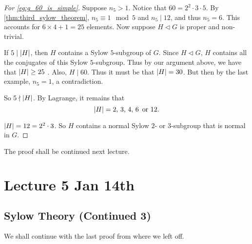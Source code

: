 \documentclass[notoc,notitlepage,nobib]{tufte-book}
\begin{document}
\begin{proof}[For \cref{eg:g_60_is_simple}]
  Suppose $n_5 > 1$. Notice that $60 = 2^2 \cdot 3 \cdot 5$. By \cref{thm:third_sylow_theorem},
  $n_5 \equiv 1 \mod 5$ and $n_5 \mid 12$, and thus $n_5 = 6$. This accounts for
  $6 \times 4 + 1 = 25$ elements. Now suppose $H \triangleleft G$ is proper and non-trivial.

  If $5 \mid \left| H \right|$, then $H$ contains a Sylow $5$-subgroup of $G$. Since
  $H \triangleleft G$, $H$ contains all the conjugates of this Sylow $5$-subgroup. Thus by
  our argument above, we have that $\left| H \right| \geq 25$ . Also, $H \mid 60$. Thus it must be that
  $\left| H \right| = 30$. But then by the last example, $n_5 = 1$, a contradiction.

  So $5 \nmid \left| H \right|$. By Lagrange, it remains that
  \begin{equation*}
    \left| H \right| = 2, \, 3, \, 4, \, 6\, \text{ or } 12.
  \end{equation*}

   $\left| H \right| = 12 = 2^2 \cdot 3$.
  So $H$ contains a normal Sylow $2$- or $3$-subgroup that is normal in $G$.
\end{proof}

The proof shall be continued next lecture.




\chapter{Lecture 5 Jan 14th}%
\label{chp:lecture_5_jan_14th}

\section{Sylow Theory (Continued 3)}%
\label{sec:sylow_theory_continued_3}

We shall continue with the last proof from where we left off.
\end{document}
